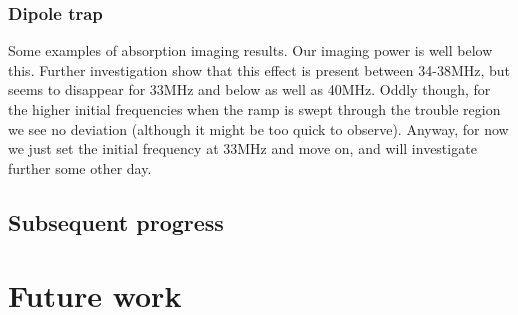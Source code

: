 \subsubsection{Dipole trap}
	Some examples of absorption imaging results.
	Our imaging power is well below this.
	Further investigation show that this effect is present between 34-38MHz, but seems to disappear for 33MHz and below as well as 40MHz.
	Oddly though, for the higher initial frequencies when the ramp is swept through the trouble region we see no deviation (although it might be too quick to observe).
	Anyway, for now we just set the initial frequency at 33MHz and move on, and will investigate further some other day.

\subsection{Subsequent progress}
\section{Future work}
